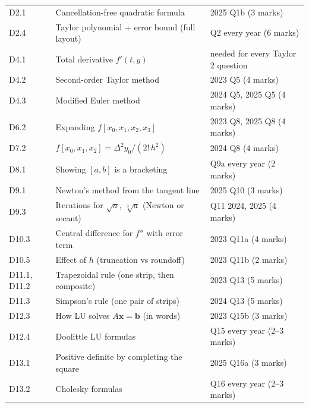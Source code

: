 \documentclass[11pt,a4paper]{article}
\newcommand{\sthree}{\textcolor{edge}{\ding{72}\ding{72}\ding{72}}}
\begin{document}
\vspace{6pt}
\begin{tcolorbox}[enhanced,colback=edgelight,colframe=edge!50,boxrule=0.5pt,arc=2pt,title={\sthree\ The exam derivations (learn these first)},coltitle=edge,colbacktitle=edgelight,fonttitle=\bfseries]
\small
\begin{tabular}{@{}lll@{}}
D2.1 & Cancellation-free quadratic formula & 2025 Q1b (3 marks)\\
D2.4 & Taylor polynomial + error bound (full layout) & Q2 every year (6 marks)\\
D4.1 & Total derivative $f'(t,y)$ & needed for every Taylor 2 question\\
D4.2 & Second-order Taylor method & 2023 Q5 (4 marks)\\
D4.3 & Modified Euler method & 2024 Q5, 2025 Q5 (4 marks)\\
D6.2 & Expanding $f[x_0,x_1,x_2,x_3]$ & 2023 Q8, 2025 Q8 (4 marks)\\
D7.2 & $f[x_0,x_1,x_2]=\Delta^2y_0/(2!\,h^2)$ & 2024 Q8 (4 marks)\\
D8.1 & Showing $[a,b]$ is a bracketing & Q9a every year (2 marks)\\
D9.1 & Newton's method from the tangent line & 2025 Q10 (3 marks)\\
D9.3 & Iterations for $\sqrt a$, $\sqrt[3]a$ (Newton or secant) & Q11 2024, 2025 (4 marks)\\
D10.3 & Central difference for $f''$ with error term & 2023 Q11a (4 marks)\\
D10.5 & Effect of $h$ (truncation vs roundoff) & 2023 Q11b (2 marks)\\
D11.1, D11.2 & Trapezoidal rule (one strip, then composite) & 2023 Q13 (5 marks)\\
D11.3 & Simpson's rule (one pair of strips) & 2024 Q13 (5 marks)\\
D12.3 & How LU solves $A\mathbf x=\mathbf b$ (in words) & 2023 Q15b (3 marks)\\
D12.4 & Doolittle LU formulas & Q15 every year (2--3 marks)\\
D13.1 & Positive definite by completing the square & 2025 Q16a (3 marks)\\
D13.2 & Cholesky formulas & Q16 every year (2--3 marks)\\
\end{tabular}
\end{tcolorbox}

\vspace{4pt}
{\small\tableofcontents}
\end{document}
